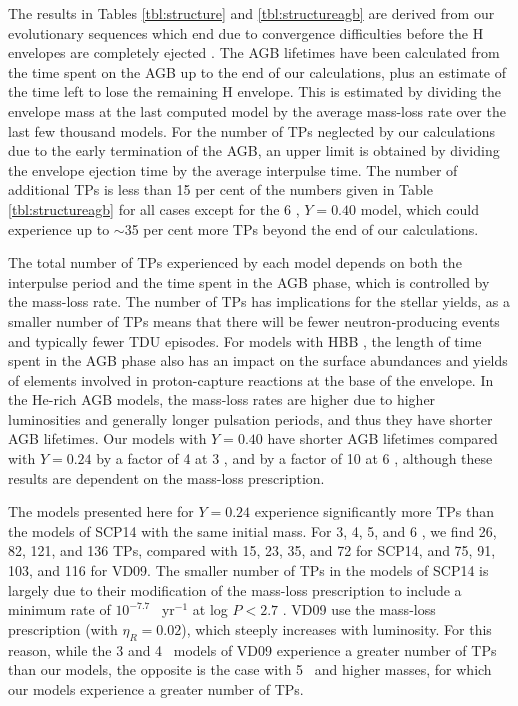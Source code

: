 The results in Tables \ref{tbl:structure} and \ref{tbl:structureagb} are derived from our evolutionary sequences which end due to convergence difficulties before the H envelopes are completely ejected \citep{Sweigart:1999tt,Lau:2012ef}. The AGB lifetimes have been calculated from the time spent on the AGB up to the end of our calculations, plus an estimate of the time left to lose the remaining H envelope. This is estimated by dividing the envelope mass at the last computed model by the average mass-loss rate over the last few thousand models. For the number of TPs neglected by our calculations due to the early termination of the AGB, an upper limit is obtained by dividing the envelope ejection time by the average interpulse time. The number of additional TPs is less than 15 per cent of the numbers given in Table \ref{tbl:structureagb} for all cases except for the 6 \Msun, $Y=0.40$ model, which could experience up to $\sim$35 per cent more TPs beyond the end of our calculations.

The total number of TPs experienced by each model depends on both the interpulse period and the time spent in the AGB phase, which is controlled by the mass-loss rate. The number of TPs has implications for the stellar yields, as a smaller number of TPs means that there will be fewer neutron-producing events and typically fewer TDU episodes. For models with HBB \citep{Iben:1975js,Renzini:1981ul,Boothroyd:1992gi,Lattanzio:1992uz}, the length of time spent in the AGB phase also has an impact on the surface abundances and yields of elements involved in proton-capture reactions at the base of the envelope. In the He-rich AGB models, the mass-loss rates are higher due to higher luminosities and generally longer pulsation periods, and thus they have shorter AGB lifetimes. Our models with $Y=0.40$ have shorter AGB lifetimes compared with $Y=0.24$ by a factor of 4 at 3 \Msun, and by a factor of 10 at 6 \Msun, although these results are dependent on the mass-loss prescription.

The models presented here for $Y=0.24$ experience significantly more TPs than the models of SCP14 with the same initial mass. For 3, 4, 5, and 6 \Msun, we find 26, 82, 121, and 136 TPs, compared with 15, 23, 35, and 72 for SCP14, and 75, 91, 103, and 116 for VD09. The smaller number of TPs in the models of SCP14 is largely due to their modification of the \citet{Vassiliadis:1993jk} mass-loss prescription to include a minimum rate of $10^{-7.7}$ \Msun\ yr$^{-1}$ at log $P < 2.7$ \citep[described in][]{Straniero:2006do}. VD09 use the \citet{Bloecker:1995ui} mass-loss prescription (with $\eta_R=0.02$), which steeply increases with luminosity. For this reason, while the 3 and 4 \Msun\ models of VD09 experience a greater number of TPs than our models, the opposite is the case with 5 \Msun\ and higher masses, for which our models experience a greater number of TPs.

